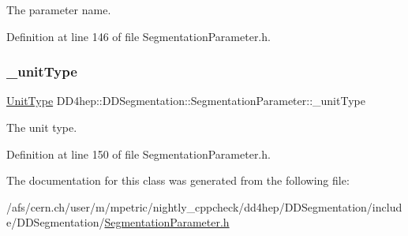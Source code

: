 The parameter name. 



Definition at line 146 of file Segmentation\+Parameter.\+h.

\hypertarget{class_d_d4hep_1_1_d_d_segmentation_1_1_segmentation_parameter_a1f5990f9669bf3265f6253f1f9a03e2a}{}\label{class_d_d4hep_1_1_d_d_segmentation_1_1_segmentation_parameter_a1f5990f9669bf3265f6253f1f9a03e2a} 
\subsubsection{\texorpdfstring{\+\_\+unit\+Type}{\_unitType}}
{\footnotesize\ttfamily \hyperlink{class_d_d4hep_1_1_d_d_segmentation_1_1_segmentation_parameter_a36f5f8b8d812b2a2b81363377565d8d4}{Unit\+Type} D\+D4hep\+::\+D\+D\+Segmentation\+::\+Segmentation\+Parameter\+::\+\_\+unit\+Type\hspace{0.3cm}{\ttfamily [protected]}}



The unit type. 



Definition at line 150 of file Segmentation\+Parameter.\+h.



The documentation for this class was generated from the following file\+:\begin{DoxyCompactItemize}
\item 
/afs/cern.\+ch/user/m/mpetric/nightly\+\_\+cppcheck/dd4hep/\+D\+D\+Segmentation/include/\+D\+D\+Segmentation/\hyperlink{_segmentation_parameter_8h}{Segmentation\+Parameter.\+h}\end{DoxyCompactItemize}
